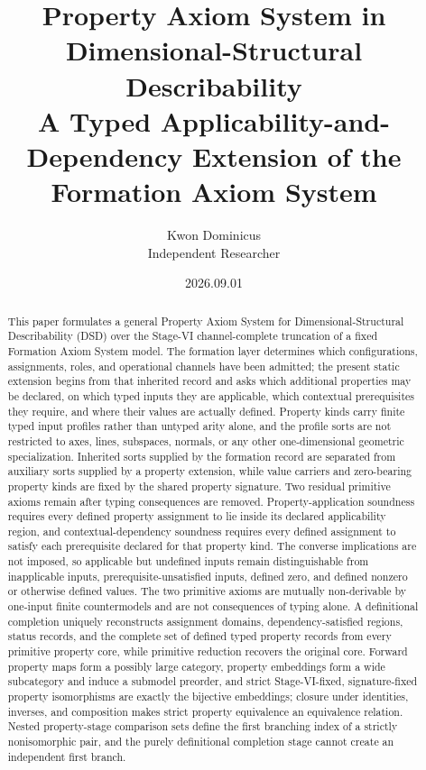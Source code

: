 \documentclass[11pt]{article}
\title{Property Axiom System in Dimensional-Structural Describability\\[0.35em]
\large A Typed Applicability-and-Dependency Extension of the Formation Axiom System}
\author{Kwon Dominicus\\\small Independent Researcher}
\date{2026.09.01}
\theoremstyle{definition}
\theoremstyle{remark}
\begin{document}
\maketitle

\begin{abstract}
This paper formulates a general Property Axiom System for Dimensional-Structural Describability (DSD) over the Stage-VI channel-complete truncation of a fixed Formation Axiom System model.
The formation layer determines which configurations, assignments, roles, and operational channels have been admitted; the present static extension begins from that inherited record and asks which additional properties may be declared, on which typed inputs they are applicable, which contextual prerequisites they require, and where their values are actually defined.
Property kinds carry finite typed input profiles rather than untyped arity alone, and the profile sorts are not restricted to axes, lines, subspaces, normals, or any other one-dimensional geometric specialization.
Inherited sorts supplied by the formation record are separated from auxiliary sorts supplied by a property extension, while value carriers and zero-bearing property kinds are fixed by the shared property signature.
Two residual primitive axioms remain after typing consequences are removed.
Property-application soundness requires every defined property assignment to lie inside its declared applicability region, and contextual-dependency soundness requires every defined assignment to satisfy each prerequisite declared for that property kind.
The converse implications are not imposed, so applicable but undefined inputs remain distinguishable from inapplicable inputs, prerequisite-unsatisfied inputs, defined zero, and defined nonzero or otherwise defined values.
The two primitive axioms are mutually non-derivable by one-input finite countermodels and are not consequences of typing alone.
A definitional completion uniquely reconstructs assignment domains, dependency-satisfied regions, status records, and the complete set of defined typed property records from every primitive property core, while primitive reduction recovers the original core.
Forward property maps form a possibly large category, property embeddings form a wide subcategory and induce a submodel preorder, and strict Stage-VI-fixed, signature-fixed property isomorphisms are exactly the bijective embeddings; closure under identities, inverses, and composition makes strict property equivalence an equivalence relation.
Nested property-stage comparison sets define the first branching index of a strictly nonisomorphic pair, and the purely definitional completion stage cannot create an independent first branch.

\end{abstract}
\end{document}
